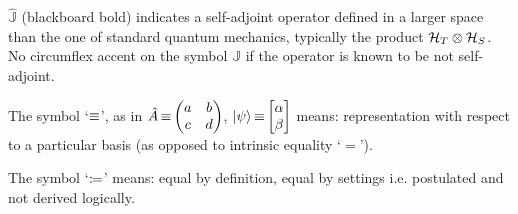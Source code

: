 $\hat{\mathbb{J}}$ (blackboard bold) indicates a self-adjoint operator defined in
a larger space than the one of standard quantum mechanics,
typically the product $\mathcal{H}_T \otimes \mathcal{H}_S$.
No circumflex accent on the symbol ${\mathbb{J}}$ if the operator is
known to be not self-adjoint.

The symbol `$\operatorname*{\equiv}$', as in $\hat{A} \repr \mqty(a&b\\c&d)$, $\ket{\psi} \repr \mqty[\alpha \\ \beta]$
means: representation with respect to a particular basis (as opposed to intrinsic equality `$=$').

The symbol `$\coloneqq$'
means: equal by definition, equal by settings i.e. postulated and not derived logically.
